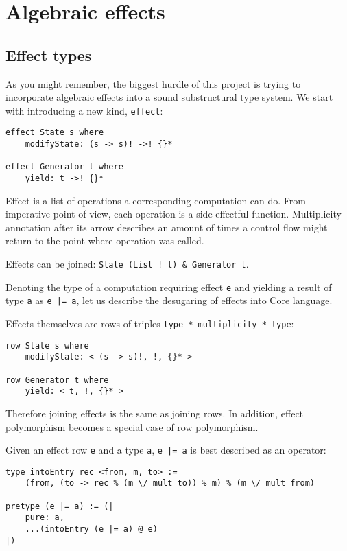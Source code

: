 \documentclass[a4paper,14pt]{extreport}
\begin{document}
\section{Algebraic effects}

\subsection{Effect types}

As you might remember, the biggest hurdle of this project is trying to
incorporate algebraic effects into a sound substructural type system. We start
with introducing a new kind, \verb|effect|:

\begin{verbatim}
effect State s where
    modifyState: (s -> s)! ->! {}*

effect Generator t where
    yield: t ->! {}*
\end{verbatim}

Effect is a list of operations a corresponding computation can do. From
imperative point of view, each operation is a side-effectful function.
Multiplicity annotation after its arrow describes an amount of times a control
flow might return to the point where operation was called.

Effects can be joined: \verb|State (List ! t) & Generator t|.

Denoting the type of a computation requiring effect \verb|e| and yielding a
result of type \verb|a| as \verb+e |= a+, let us describe the desugaring of
effects into Core language.

Effects themselves are rows of triples \verb|type * multiplicity * type|:

\begin{verbatim}
row State s where
    modifyState: < (s -> s)!, !, {}* >

row Generator t where
    yield: < t, !, {}* >
\end{verbatim}

Therefore joining effects is the same as joining rows. In addition, effect
polymorphism becomes a special case of row polymorphism.

Given an effect row \verb|e| and a type \verb|a|, \verb+e |= a+ is best
described as an operator:

\begin{verbatim}
type intoEntry rec <from, m, to> :=
    (from, (to -> rec % (m \/ mult to)) % m) % (m \/ mult from)

pretype (e |= a) := (|
    pure: a,
    ...(intoEntry (e |= a) @ e)
|)
\end{verbatim}
\end{document}
